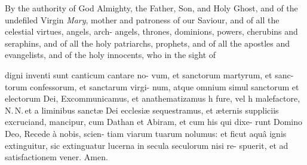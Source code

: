 \documentclass{article}
\begin{document}
\lqq By the authority of God Almighty,\break
\lqq the Father, Son, and Holy Ghost, and\break
\lqq of the undefiled Virgin \textit{Mary}, mother
\lqq and patroness of our Saviour, and of\break
\lqq all the celestial virtues, angels, arch-\break
\lqq angels, thrones, dominions, powers,\break
\lqq cherubins and seraphins, and of all the\break
\lqq holy patriarchs, prophets, and of all\break
\lqq the apostles and evangelists, and of the\break
\lqq holy innocents, who in the sight of

\noindent
digni inventi sunt canticum cantare no-\break
vum, et sanctorum martyrum, et sanc-\break
torum confessorum, et sanctarum virgi-\break
num, atque omnium simul sanctorum et\break
electorum Dei, \tsh Excommunicamus, et\break
anathematizamus h
fure, vel h\break
malefactore, N.\,N.\,et a liminibus sanctæ\break
Dei ecclesiæ sequestramus, et æternis\break
suppliciis excruciand,
mancipur, cum\break
Dathan et Abiram, et cum his qui dixe-\break
runt Domino Deo, Recede à nobis, scien-\break
tiam viarum tuarum nolumus: et ficut\break
aquâ ignis extinguitur, sic extinguatur\break
lucerna  in secula seculorum nisi re-\break
spuerit, et ad satisfactionem vener.\break
Amen.


\newpage
\bigskip\noindent
{}
\newpage
\end{document}
